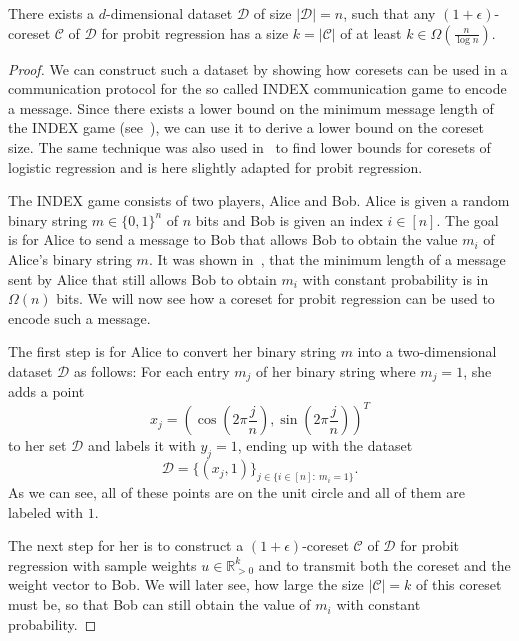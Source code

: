 \begin{theorem}
    \label{theorem:index}
    There exists a $d$-dimensional dataset $\mathcal{D}$ of size
    $|\mathcal{D}| = n$, such
    that any $(1+\epsilon)$-coreset $\mathcal{C}$ of $\mathcal{D}$
    for probit regression has a size $k = |\mathcal{C}|$
    of at least $k \in \Omega\left(\frac{n}{\log{n}}\right)$.
\end{theorem}
\begin{proof}
    We can construct such a  dataset by showing
    how coresets can be used in a
    communication protocol for the so called INDEX communication game
    to encode a message.
    Since there exists a lower bound on the minimum
    message length of the INDEX game (see~\cite{index}),
    we can use it to derive a lower bound on the
    coreset size.
    The same technique was also used in~\cite{on-coresets} to find
    lower bounds for coresets of logistic regression and is here slightly
    adapted for probit regression.

    The INDEX game consists of two players, Alice and Bob.
    Alice is given a random binary string $m \in \{0, 1\}^n$ of $n$ bits
    and Bob is given an index $i \in [n]$.
    The goal is for Alice to send a message to Bob that allows
    Bob to obtain the value $m_i$ of Alice's binary string $m$.
    It was shown in~\cite{index}, that the minimum length of a message
    sent by Alice that still allows Bob to obtain $m_i$ with
    constant probability is in $\Omega(n)$ bits.
    We will now see how a coreset for probit regression can be used
    to encode such a message.

    The first step is for Alice to convert her binary string $m$ into
    a two-dimensional dataset $\mathcal{D}$ as follows:
    For each entry $m_j$ of her binary string where $m_j = 1$, she adds
    a point
    \begin{equation*}
        x_j = \left( \cos{\left(2 \pi \frac{j}{n}\right)},
        \sin{\left(2 \pi \frac{j}{n}\right)} \right)^T
    \end{equation*}
    to her set $\mathcal{D}$ and labels it with $y_j = 1$,
    ending up with the dataset
    \begin{equation*}
        \mathcal{D} = \{(x_j, 1)\}_{j \in \{i \in [n]:\ m_i = 1 \}}.
    \end{equation*}
    As we can see, all of these points are on the unit circle and all
    of them are labeled with $1$.

    The next step for her is to construct a
    $(1+\epsilon)$-coreset $\mathcal{C}$ of $\mathcal{D}$
    for probit regression with sample weights $u \in \mathbb{R}^k_{>0}$
    and to transmit both the coreset and the weight vector to Bob.
    We will later see, how
    large the size $|\mathcal{C}|=k$ of this coreset must be,
    so that Bob can still
    obtain the value of $m_i$ with constant probability.


\end{proof}
